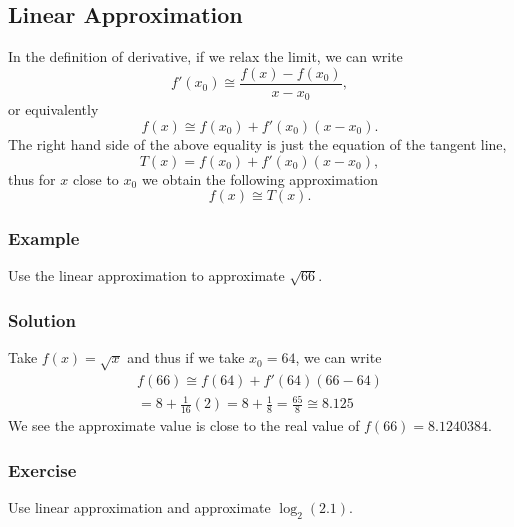 \documentclass[letterpaper,10pt,twoside,twocolumn,openany]{book}
\begin{document}
\subsection{Linear Approximation}
In the definition of derivative, if we relax the limit, we can write
\[ f' ( x_0) \cong \frac{f ( x) - f ( x_0)}{x - x_0}, \]
or equivalently
\[ f ( x) \cong f ( x_0) + f' ( x_0) ( x - x_0). \]
The right hand side of the above equality is just the equation of the tangent line,
\[ T ( x) = f ( x_0) + f' ( x_0) ( x - x_0), \]
thus for $x$ close to $x_0$ we obtain the following approximation
\[ f ( x) \cong T ( x). \]
\subsubsection*{Example}
Use the linear approximation to approximate $\sqrt{66}$.
\subsubsection*{Solution}
Take $f ( x) = \sqrt{x}$ and thus if we take $x_0 = 64$, we can write
\begin{gather*}
    f ( 66) \cong f ( 64) + f' ( 64) ( 66 - 64)\\
    = 8 + \frac{1}{16} ( 2) = 8 + \frac{1}{8} = \frac{65}{8} \cong 8.125 
\end{gather*} 
We see the approximate value is close to the real value of $f ( 66) = 8.1240384$.

\subsubsection*{Exercise}
Use linear approximation and approximate $\log_2 ( 2.1)$.

\newpage
\end{document}
